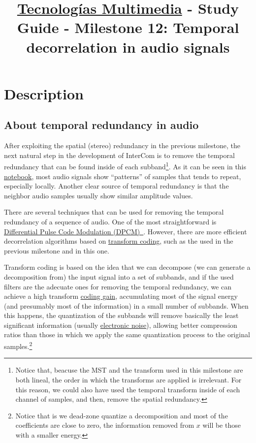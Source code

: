 \title{\href{https://www.ual.es/estudios/grados/presentacion/plandeestudios/asignatura/4015/40154321?idioma=zh_CN}{Tecnologías Multimedia} - Study Guide - Milestone 12: Temporal decorrelation in audio signals}

\maketitle

\section{Description}

\subsection{About temporal redundancy in audio}
After exploiting the spatial (stereo) redundancy in the previous
milestone, the next natural step in the development of InterCom is to
remove the temporal redundancy that can be found inside of each
subband\footnote{Notice that, beacuse the MST and the transform used
  in this milestone are both lineal, the order in which the transforms
  are applied is irrelevant. For this reason, we could also have used
  the temporal transform inside of each channel of samples, and then,
  remove the spatial redundancy.}. As it can be seen in this
\href{https://github.com/Tecnologias-multimedia/intercom/blob/master/docs/audio_viewer.ipynb}{notebook},
most audio signals show ``patterns'' of samples that tends to repeat,
especially locally. Another clear source of temporal redundancy is
that the neighbor audio samples usually show similar amplitude values.

There are several techniques that can be used for removing the
temporal redundancy of a sequence of audio. One of the most
straightforward is
\href{https://en.wikipedia.org/wiki/Differential_pulse-code_modulation}{Differential
  Pulse Code Modulation
  (DPCM)~\cite{sayood2017introduction}}. However, there are more
efficient decorrelation algorithms based on
\href{https://en.wikipedia.org/wiki/Transform_coding}{transform
  coding}, such as the used in the previous milestone and in this one.

Transform coding is based on the idea that we can decompose (we can
generate a decomposition from) the input signal into a set of
subbands, and if the used filters are the adecuate ones for removing
the temporal redundancy, we can achieve a high transform
\href{https://en.wikipedia.org/wiki/Coding_gain}{coding gain},
accumulating most of the signal energy (and presumably most of the
information) in a small number of subbands. When this happens, the
quantization of the subbands will remove basically the least
significant information (usually
\href{https://en.wikipedia.org/wiki/Noise_(electronics)}{electronic
  noise}), allowing better compression ratios than those in which we
apply the same quantization process to the original
samples.\footnote{Notice that is we dead-zone quantize a decomposition
and most of the coefficients are close to zero, the information
removed from $x$ will be those with a smaller energy.}

